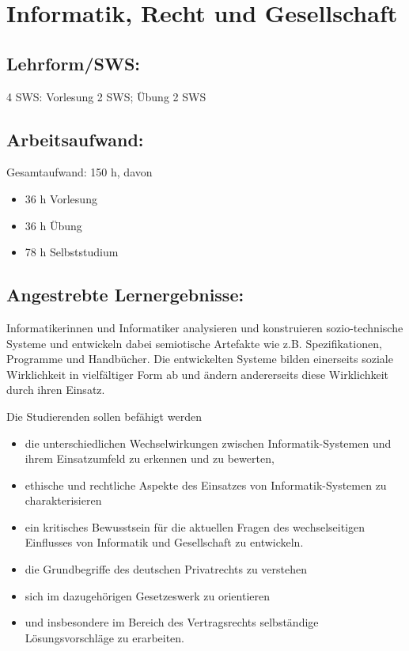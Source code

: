 \chapter{Informatik, Recht und
Gesellschaft}\label{informatik-recht-und-gesellschaft}

\section{Lehrform/SWS:}\label{lehrformsws-16}

4 SWS: Vorlesung 2 SWS; Übung 2 SWS

\section{Arbeitsaufwand:}\label{arbeitsaufwand-16}

Gesamtaufwand: 150 h, davon

\begin{itemize}
\tightlist
\item
  36 h Vorlesung
\item
  36 h Übung
\item
  78 h Selbststudium
\end{itemize}

\section{Angestrebte
Lernergebnisse:}\label{angestrebte-lernergebnisse-16}

Informatikerinnen und Informatiker analysieren und konstruieren
sozio-technische Systeme und entwickeln dabei semiotische Artefakte wie
z.B. Spezifikationen, Programme und Handbücher. Die entwickelten Systeme
bilden einerseits soziale Wirklichkeit in vielfältiger Form ab und
ändern andererseits diese Wirklichkeit durch ihren Einsatz.

Die Studierenden sollen befähigt werden

\begin{itemize}
\tightlist
\item
  die unterschiedlichen Wechselwirkungen zwischen Informatik-Systemen
  und ihrem Einsatzumfeld zu erkennen und zu bewerten,
\item
  ethische und rechtliche Aspekte des Einsatzes von Informatik-Systemen
  zu charakterisieren
\item
  ein kritisches Bewusstsein für die aktuellen Fragen des
  wechselseitigen Einflusses von Informatik und Gesellschaft zu
  entwickeln.
\item
  die Grundbegriffe des deutschen Privatrechts zu verstehen
\item
  sich im dazugehörigen Gesetzeswerk zu orientieren
\item
  und insbesondere im Bereich des Vertragsrechts selbständige
  Lösungsvorschläge zu erarbeiten.
\end{itemize}

